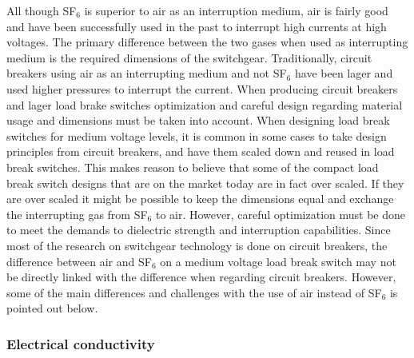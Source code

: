 \documentclass[10pt,a4paper]{article}
\begin{document}
All though SF$_6$ is superior to air as an interruption medium, air is fairly good and have been successfully used in the past to interrupt high currents at high voltages. The primary difference between the two gases when used as interrupting medium is the required dimensions of the switchgear. Traditionally, circuit breakers using air as an interrupting medium and not SF$_6$ have been lager and used higher pressures to interrupt the current. When producing circuit breakers and lager load brake switches optimization and careful design regarding material usage and dimensions must be taken into account. When designing load break switches for medium voltage levels, it is common in some cases to take design principles from circuit breakers, and have them scaled down and reused in load break switches. This makes reason to believe that some of the compact load break switch designs that are on the market today are in fact over scaled. If they are over scaled it might be possible to keep the dimensions equal and exchange the interrupting gas from SF$_6$ to air. However, careful optimization must be done to meet the demands to dielectric strength and interruption capabilities. Since most of the research on switchgear technology is done on circuit breakers, the difference between air and SF$_6$ on a medium voltage load break switch may not be directly linked with the difference when regarding circuit breakers. However, some of the main differences and challenges with the use of air instead of SF$_6$ is pointed out below.

\subsubsection*{Electrical conductivity}
\end{document}
